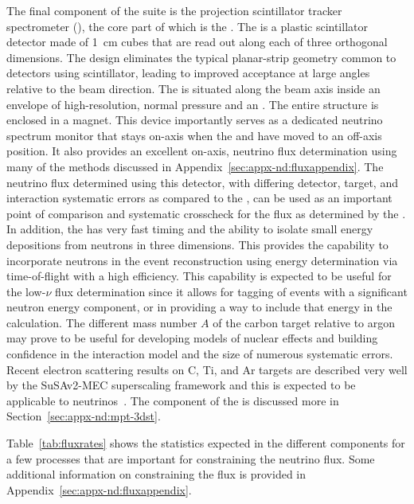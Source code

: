 The final component of the   suite is the \threed projection scintillator tracker spectrometer (),  the core part of which is the .  The  is a plastic scintillator detector made of \SI{1}{cm} cubes that are read out along each of three orthogonal dimensions.  The design eliminates the typical planar-strip geometry common to detectors using scintillator, leading to improved acceptance at large angles relative to the beam direction.  The  is situated along the beam axis inside an envelope of high-resolution, normal pressure  and an .  The entire structure is enclosed in a magnet. This device importantly serves as a dedicated  neutrino spectrum monitor that stays on-axis when the    and  have moved to an off-axis position. 
It also provides an excellent on-axis, neutrino flux determination using many of the methods discussed in Appendix~\ref{sec:appx-nd:fluxappendix}.  The neutrino flux determined using this detector, with  differing detector, target, and interaction systematic errors as compared to the , can be used as an important point of comparison and systematic crosscheck for the flux as determined by the .
In addition, the  has very fast timing and the ability to isolate small energy depositions from neutrons in three dimensions.  This provides the capability to  incorporate neutrons in the event reconstruction using energy determination via time-of-flight with a high efficiency. This capability is expected to be useful for the low-$\nu$ flux determination since it allows for tagging of events with a significant neutron energy component, or in providing a way to include that energy in the calculation.
The %
different mass number $A$ of the carbon target relative to argon may prove to be useful for developing models of nuclear effects and building confidence in the interaction model and the size of numerous systematic errors.  Recent electron scattering results on C, Ti, and Ar targets are described very well by the SuSAv2-MEC superscaling framework and this is expected to be applicable to neutrinos~\cite{Barbaro:2019vsr}.  The  component of the  is discussed more in Section~\ref{sec:appx-nd:mpt-3dst}.

Table~\ref{tab:fluxrates} shows the statistics expected in the different  components for a few processes that are important for constraining the neutrino flux.  Some additional information on constraining the flux is provided in Appendix~\ref{sec:appx-nd:fluxappendix}.

